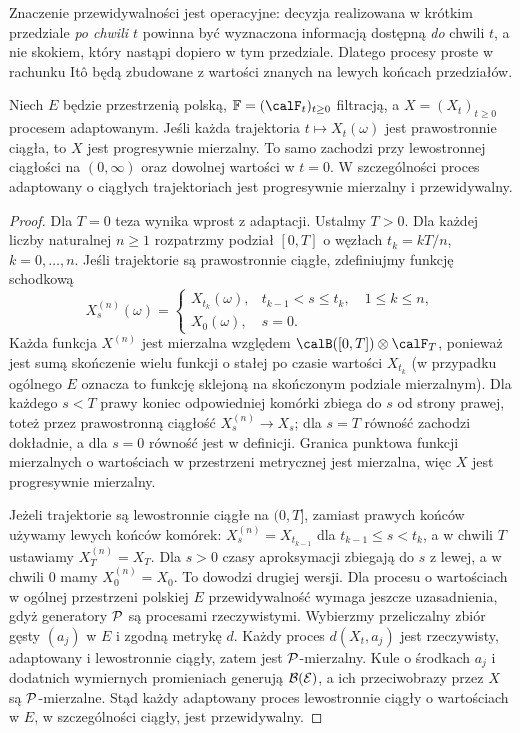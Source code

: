 Znaczenie przewidywalności jest operacyjne: decyzja
realizowana w krótkim przedziale \emph{po chwili $t$}
powinna być wyznaczona informacją dostępną \emph{do}
chwili $t$, a nie skokiem, który nastąpi dopiero w tym
przedziale. Dlatego procesy proste w rachunku Itô
będą zbudowane z wartości znanych na lewych końcach
przedziałów.

\begin{twierdzenie}
\label{thm:prog}
Niech $E$ będzie przestrzenią polską,
$\mathbb F=(\calF_t)_{t\ge0}$ filtracją, a
$X=(X_t)_{t\ge0}$ procesem adaptowanym.
Jeśli każda trajektoria $t\mapsto X_t(\omega)$
jest prawostronnie ciągła, to $X$ jest progresywnie
mierzalny. To samo zachodzi przy lewostronnej
ciągłości na $(0,\infty)$ oraz dowolnej wartości w
$t=0$. W szczególności proces adaptowany o ciągłych
trajektoriach jest progresywnie mierzalny i przewidywalny.
\end{twierdzenie}
\begin{proof}
Dla $T=0$ teza wynika wprost z adaptacji. Ustalmy
$T>0$. Dla każdej liczby naturalnej $n\ge1$
rozpatrzmy podział $[0,T]$ o węzłach
$t_k=kT/n$, $k=0,\ldots,n$. Jeśli trajektorie są
prawostronnie ciągłe, zdefiniujmy funkcję schodkową
\[
X^{(n)}_s(\omega)=
\begin{cases}
X_{t_k}(\omega),&t_{k-1}<s\le t_k,\quad 1\le k\le n,\\
X_0(\omega),&s=0.
\end{cases}
\]
Każda funkcja $X^{(n)}$ jest mierzalna względem
$\calB([0,T])\otimes\calF_T$, ponieważ jest sumą
skończenie wielu funkcji o stałej po czasie wartości
$X_{t_k}$ (w przypadku ogólnego $E$ oznacza to
funkcję sklejoną na skończonym podziale mierzalnym).
Dla każdego $s<T$ prawy koniec odpowiedniej komórki
zbiega do $s$ od strony prawej, toteż przez
prawostronną ciągłość $X^{(n)}_s\to X_s$;
dla $s=T$ równość zachodzi dokładnie, a dla $s=0$
równość jest w definicji. Granica punktowa funkcji
mierzalnych o wartościach w przestrzeni metrycznej
jest mierzalna, więc $X$ jest progresywnie mierzalny.

Jeżeli trajektorie są lewostronnie ciągłe na $(0,T]$,
zamiast prawych końców używamy lewych końców
komórek: $X^{(n)}_s=X_{t_{k-1}}$ dla
$t_{k-1}\le s<t_k$, a w chwili $T$ ustawiamy
$X^{(n)}_T=X_T$. Dla $s>0$ czasy aproksymacji
zbiegają do $s$ z lewej, a w chwili $0$ mamy
$X^{(n)}_0=X_0$. To dowodzi drugiej wersji.
Dla procesu o wartościach w ogólnej przestrzeni polskiej
$E$ przewidywalność wymaga jeszcze uzasadnienia, gdyż
generatory $\cal P$ są procesami rzeczywistymi.
Wybierzmy przeliczalny zbiór gęsty $(a_j)$ w $E$ i zgodną
metrykę $d$. Każdy proces $d(X_t,a_j)$ jest rzeczywisty,
adaptowany i lewostronnie ciągły, zatem jest
$\cal P$-mierzalny. Kule o środkach $a_j$ i dodatnich
wymiernych promieniach generują $\cal B(E)$, a ich
przeciwobrazy przez $X$ są $\cal P$-mierzalne.
Stąd każdy adaptowany proces lewostronnie ciągły
o wartościach w $E$, w szczególności ciągły,
jest przewidywalny.
\end{proof}

